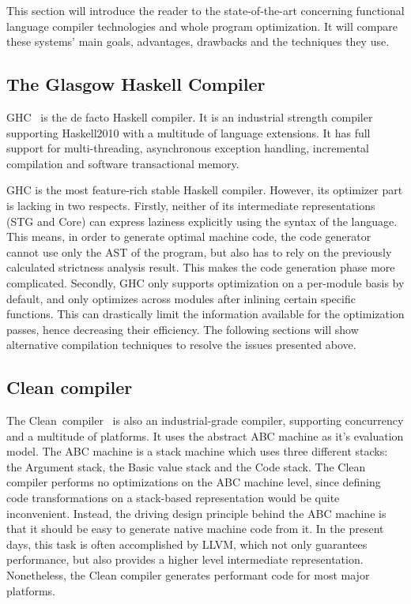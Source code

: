 \documentclass[main.tex]{subfiles}
\begin{document}
	
	This section will introduce the reader to the state-of-the-art concerning functional language compiler technologies and whole program optimization. It will compare these systems' main goals, advantages, drawbacks and the techniques they use.
	
	\subsection{The Glasgow Haskell Compiler}

	GHC~\cite{ghc} is the de facto Haskell compiler. It is an industrial strength compiler supporting Haskell2010 with a multitude of language extensions. It has full support for multi-threading, asynchronous exception handling, incremental compilation and software transactional memory.
	
	GHC is the most feature-rich stable Haskell compiler. However, its optimizer part is lacking in two respects. Firstly, neither of its intermediate representations (STG and Core) can express laziness explicitly using the syntax of the language. This means, in order to generate optimal machine code, the code generator cannot use only the AST of the program, but also has to rely on the previously calculated strictness analysis result. This makes the code generation phase more complicated. Secondly, GHC only supports optimization on a per-module basis by default, and only optimizes across modules after inlining certain specific functions. This can drastically limit the information available for the optimization passes, hence decreasing their efficiency. The following sections will show alternative compilation techniques to resolve the issues presented above.
	
	\subsection{Clean compiler}
	
	The Clean~compiler~\cite{clean-book} is also an industrial-grade compiler, supporting concurrency and a multitude of platforms. It uses the abstract ABC machine as it's evaluation model. The ABC machine is a stack machine which uses three different stacks: the Argument stack, the Basic value stack and the Code stack. The Clean compiler performs no optimizations on the ABC machine level, since defining code transformations on a stack-based representation would be quite inconvenient. Instead, the driving design principle behind the ABC machine is that it should be easy to generate native machine code from it. In the present days, this task is often accomplished by LLVM, which not only guarantees performance, but also provides a higher level intermediate representation. Nonetheless, the Clean compiler generates performant code for most major platforms.
	
\end{document}
